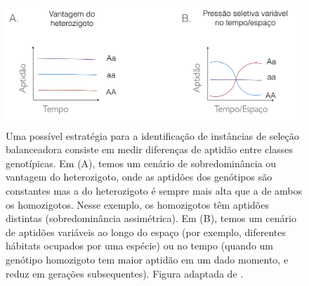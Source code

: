 \begin{refsection}
\begin{figure}[h]
\includegraphics[height=6 cm,keepaspectratio]{chap1_folder/Figures/frequencia_equilibrio_2.png}
\caption{Uma possível estratégia para a identificação de instâncias de seleção balanceadora consiste em medir diferenças de aptidão entre classes genotípicas. Em (A), temos um cenário de sobredominância ou vantagem do heterozigoto, onde as aptidões dos genótipos são constantes mas a do heterozigoto é sempre mais alta que a de ambos os homozigotos. Nesse exemplo, os homozigotos têm aptidões distintas (sobredominância assimétrica). Em (B), temos um cenário de aptidões variáveis ao longo do espaço (por exemplo, diferentes hábitats ocupados por uma espécie) ou no tempo (quando um genótipo homozigoto tem maior aptidão em um dado momento, e reduz em gerações subsequentes). Figura adaptada de \textcite{Key2014b}.}
\label{fig:FrequenciaEquilibrio2}
\end{figure}




\end{refsection}
